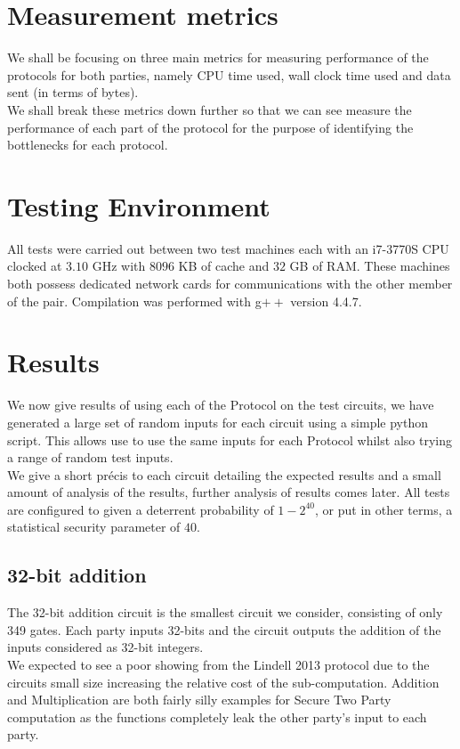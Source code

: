\documentclass[ %
                    author={Nicholas Tutte},
                supervisor={Prof. Nigel Smart},
                    degree={MEng},
                     title={Secure Two Party Computation},
                  subtitle={A practical comparison of recent protocols},
                      type={Research - GG1K},
                      year={2015} ]{dissertation}
\begin{document}
		\section{Measurement metrics}
			We shall be focusing on three main metrics for measuring performance of the protocols for both parties, namely CPU time used, wall clock time used and data sent (in terms of bytes).\\

			We shall break these metrics down further so that we can see measure the performance of each part of the protocol for the purpose of identifying the bottlenecks for each protocol.

		\section{Testing Environment}
			All tests were carried out between two test machines each with an i7-3770S CPU clocked at $3.10$ GHz with $8096$ KB of cache and $32$ GB of RAM. These machines both possess dedicated network cards for communications with the other member of the pair. Compilation was performed with g$++$ version 4.4.7. 

		\section{Results}
			We now give results of using each of the Protocol on the test circuits, we have generated a large set of random inputs for each circuit using a simple python script. This allows use to use the same inputs for each Protocol whilst also trying a range of random test inputs.\\
			
			We give a short précis to each circuit detailing the expected results and a small amount of analysis of the results, further analysis of results comes later. All tests are configured to given a deterrent probability of $1 - 2^{40}$, or put in other terms, a statistical security parameter of $40$.

			\subsection{32-bit addition}
				The 32-bit addition circuit is the smallest circuit we consider, consisting of only 349 gates. Each party inputs 32-bits and the circuit outputs the addition of the inputs considered as 32-bit integers.\\

				We expected to see a poor showing from the Lindell 2013 protocol due to the circuits small size increasing the relative cost of the sub-computation. Addition and Multiplication are both fairly silly examples for Secure Two Party computation as the functions completely leak the other party's input to each party. 
\end{document}
